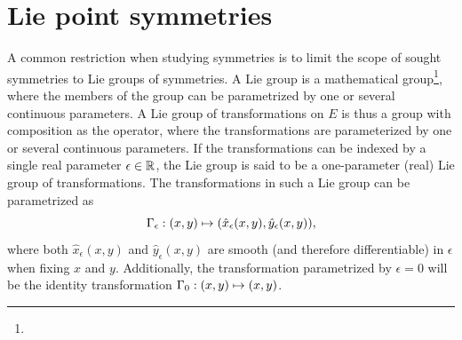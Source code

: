 \section{Lie point symmetries}

A common restriction when studying symmetries is to limit the scope of sought symmetries to Lie groups of symmetries.
A Lie group is a mathematical group\footnote{}, where the members of the group can be parametrized by one or several continuous parameters.%
A Lie group of transformations on \(E\) is thus a group with composition as the operator, where the transformations are parameterized by one or several continuous parameters.
If the transformations can be indexed by a single real parameter \(\epsilon \in \mathbb{R}\), the Lie group is said to be a one-parameter (real) Lie group of transformations.
The transformations in such a Lie group can be parametrized as
\begin{equation} \label{eq:1p-lie-point-symmetry}
  \Gamma_\epsilon: \pqty{x,y} \mapsto \pqty{\hat{x}_\epsilon(x,y), \hat{y}_\epsilon(x,y)},
\end{equation}
where both \(\hat{x}_\epsilon(x,y)\) and \(\hat{y}_\epsilon(x,y)\) are smooth (and therefore differentiable) in \(\epsilon\) when fixing \(x\) and \(y\).
Additionally, the transformation parametrized by \(\epsilon = 0\) will be the identity transformation \(\Gamma_0: \pqty{x,y} \mapsto \pqty{x,y}\).

